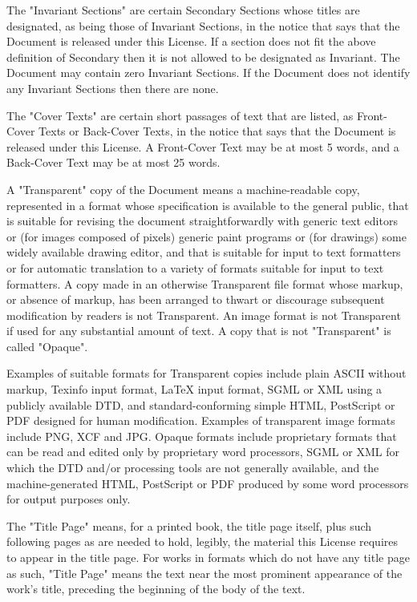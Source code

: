 \documentclass[oneside,english,a4paper,10pt,oneside,openany,final]{memoir}
\begin{document}
The "Invariant Sections" are certain Secondary Sections whose titles are designated, as being those of Invariant Sections, in the notice that says that the Document is released under this License. If a section does not fit the above definition of Secondary then it is not allowed to be designated as Invariant. The Document may contain zero Invariant Sections. If the Document does not identify any Invariant Sections then there are none.

The "Cover Texts" are certain short passages of text that are listed, as Front-Cover Texts or Back-Cover Texts, in the notice that says that the Document is released under this License. A Front-Cover Text may be at most 5 words, and a Back-Cover Text may be at most 25 words.

A "Transparent" copy of the Document means a machine-readable copy, represented in a format whose specification is available to the general public, that is suitable for revising the document straightforwardly with generic text editors or (for images composed of pixels) generic paint programs or (for drawings) some widely available drawing editor, and that is suitable for input to text formatters or for automatic translation to a variety of formats suitable for input to text formatters. A copy made in an otherwise Transparent file format whose markup, or absence of markup, has been arranged to thwart or discourage subsequent modification by readers is not Transparent. An image format is not Transparent if used for any substantial amount of text. A copy that is not "Transparent" is called "Opaque".

Examples of suitable formats for Transparent copies include plain ASCII without markup, Texinfo input format, LaTeX input format, SGML or XML using a publicly available DTD, and standard-conforming simple HTML, PostScript or PDF designed for human modification. Examples of transparent image formats include PNG, XCF and JPG. Opaque formats include proprietary formats that can be read and edited only by proprietary word processors, SGML or XML for which the DTD and/or processing tools are not generally available, and the machine-generated HTML, PostScript or PDF produced by some word processors for output purposes only.

The "Title Page" means, for a printed book, the title page itself, plus such following pages as are needed to hold, legibly, the material this License requires to appear in the title page. For works in formats which do not have any title page as such, "Title Page" means the text near the most prominent appearance of the work's title, preceding the beginning of the body of the text.
\end{document}
